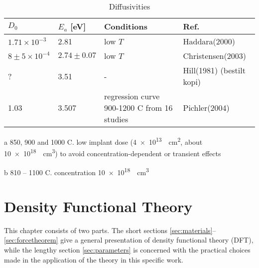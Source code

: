\documentclass[11pt,bibliography=totoc,index=totoc]{scrbook}   %
\begin{document}
\begin{table}[htbp]
  \centering
  \begin{threeparttable}[htbp]
  \begin{tabular}{llll}
      \toprule
        $D_0$ & $E_a$ [eV] & Conditions & Ref. \\
      \midrule
      $1.71\times 10^{-3}$ & 2.81 & low $T$\tnote{a} & Haddara(2000)\cite{Haddara:2000} \\
      $8\pm5\times 10^{-4}$ & $2.74\pm 0.07$ & low $T$\tnote{b} & Christensen(2003)\cite{Christensen:2003} \\
      ? & 3.51 & - & Hill(1981) (bestilt kopi) \\
      1.03 & 3.507 & regression curve 900-1200 C from 16 studies & Pichler(2004)\cite{Pichler:2004} \\
      \bottomrule
    \end{tabular}
    {\footnotesize
        \begin{tablenotes}
          \item[a] 850, 900 and 1000 C.
            low implant dose (\SI{4e13}{\per\centi\metre\squared}, about \SI{10e18}{\per\centi\metre\cubed}) to 
            avoid concentration-dependent or transient effects
          \item[b] 810 – 1100 C. concentration \SI{10e18}{\per\centi\metre\cubed}
        \end{tablenotes}
    }
  \end{threeparttable}
  \caption{Diffusivities}
  \label{tab:Label}
\end{table}


%
\chapter{Density Functional Theory}\label{cha:DFT}
%

This chapter consists of two parts. The short sections \ref{sec:materials}--\ref{sec:forcetheorem} give a general presentation of density functional theory (DFT), 
while the lengthy section \ref{sec:parameters} is concerned with the practical choices made in the application of the theory in this specific work.
\end{document}
